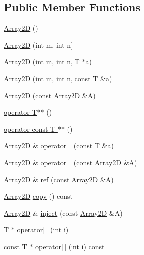 \subsection*{Public Member Functions}
\begin{DoxyCompactItemize}
\item 
\hyperlink{classTNT_1_1Array2D_ab01d5e4b88c04d9e4906e7ea069f9dc0}{Array2D} ()
\item 
\hyperlink{classTNT_1_1Array2D_a80990fd85f6c04956a247d43d23a6af4}{Array2D} (int m, int n)
\item 
\hyperlink{classTNT_1_1Array2D_a7447ecfb709ce78db3c78ff21104f6f2}{Array2D} (int m, int n, T $\ast$a)
\item 
\hyperlink{classTNT_1_1Array2D_a0bbed4288ef81ee0c9baabf69c824191}{Array2D} (int m, int n, const T \&a)
\item 
\hyperlink{classTNT_1_1Array2D_a065e795f6f2486ca7ea0bca09200dbd4}{Array2D} (const \hyperlink{classTNT_1_1Array2D}{Array2D} \&A)
\item 
\hyperlink{classTNT_1_1Array2D_ab0edc94ba076bb743ace676d7717260c}{operator T$\ast$$\ast$} ()
\item 
\hyperlink{classTNT_1_1Array2D_a38bf24494047929cb39c89b5c9c516f7}{operator const T $\ast$$\ast$} ()
\item 
\hyperlink{classTNT_1_1Array2D}{Array2D} \& \hyperlink{classTNT_1_1Array2D_af14c53b4b3977ab8ecb34da61e5a6e4c}{operator=} (const T \&a)
\item 
\hyperlink{classTNT_1_1Array2D}{Array2D} \& \hyperlink{classTNT_1_1Array2D_a291213171560381b270246be0bbe75c0}{operator=} (const \hyperlink{classTNT_1_1Array2D}{Array2D} \&A)
\item 
\hyperlink{classTNT_1_1Array2D}{Array2D} \& \hyperlink{classTNT_1_1Array2D_a45629cdcb71db56e68c61721ebd6e1cf}{ref} (const \hyperlink{classTNT_1_1Array2D}{Array2D} \&A)
\item 
\hyperlink{classTNT_1_1Array2D}{Array2D} \hyperlink{classTNT_1_1Array2D_a19bbe91d984c88b68ab5d7e53be9e177}{copy} () const
\item 
\hyperlink{classTNT_1_1Array2D}{Array2D} \& \hyperlink{classTNT_1_1Array2D_a24f86f6bf4fd6436946c82e55a12af24}{inject} (const \hyperlink{classTNT_1_1Array2D}{Array2D} \&A)
\item 
T $\ast$ \hyperlink{classTNT_1_1Array2D_a472e0ff84ff7767033dc847a7a9c34cd}{operator\mbox{[}$\,$\mbox{]}} (int i)
\item 
const T $\ast$ \hyperlink{classTNT_1_1Array2D_ac1394cbc900adcec3233ff231d9eea4a}{operator\mbox{[}$\,$\mbox{]}} (int i) const

\end{DoxyCompactItemize}
